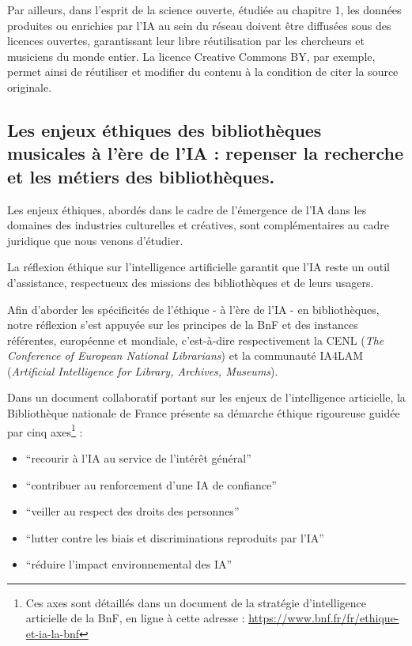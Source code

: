Par ailleurs, dans l'esprit de la science ouverte, étudiée au chapitre 1, les données produites ou enrichies par l’IA  au sein du réseau doivent être diffusées sous des licences ouvertes, garantissant leur libre réutilisation par les chercheurs et musiciens du monde entier. La licence Creative Commons BY, par exemple, permet ainsi de réutiliser et modifier du contenu à la condition de citer la source originale. 



\subsection*{Les enjeux éthiques des bibliothèques musicales à l'ère de l'IA : repenser la recherche et les métiers des bibliothèques.}

Les enjeux éthiques, abordés dans le cadre de l'émergence de l'IA dans les domaines des industries culturelles et créatives, sont complémentaires au cadre juridique que nous venons d'étudier. 

La réflexion éthique sur l'intelligence artificielle garantit que l'IA reste un outil d'assistance, respectueux des missions des bibliothèques et de leurs usagers. 

Afin d'aborder les spécificités de l'éthique - à l'ère de l'IA - en bibliothèques, notre réflexion s'est appuyée sur les principes de la BnF et des instances référentes, européenne et mondiale, c'est-à-dire respectivement la CENL (\textit{The Conference of European National Librarians}) et la communauté IA4LAM (\textit{Artificial Intelligence for Library, Archives, Museums}). 

Dans un document collaboratif portant sur les enjeux de l'intelligence articielle, la Bibliothèque nationale de France présente sa démarche éthique rigoureuse guidée par cinq axes\footnote{Ces axes sont détaillés dans un document de la stratégie d'intelligence articielle de la BnF, en ligne à cette adresse : \url{https://www.bnf.fr/fr/ethique-et-ia-la-bnf}} :

\begin{itemize}
	\item \enquote{recourir à l'IA au service de l'intérêt général}
	\item \enquote{contribuer au renforcement d'une IA de confiance}
	\item \enquote{veiller au respect des droits des personnes}
	\item \enquote{lutter contre les biais et discriminations reproduits par l'IA}
	\item \enquote{réduire l'impact environnemental des IA}
\end{itemize}



